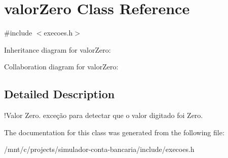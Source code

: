 \hypertarget{classvalorZero}{}\section{valor\+Zero Class Reference}
\label{classvalorZero}


{\ttfamily \#include $<$execoes.\+h$>$}



Inheritance diagram for valor\+Zero\+:


Collaboration diagram for valor\+Zero\+:


\subsection{Detailed Description}
!\+Valor Zero. exceção para detectar que o valor digitado foi Zero. 

The documentation for this class was generated from the following file\+:\begin{DoxyCompactItemize}
\item 
/mnt/c/projects/simulador-\/conta-\/bancaria/include/execoes.\+h\end{DoxyCompactItemize}
